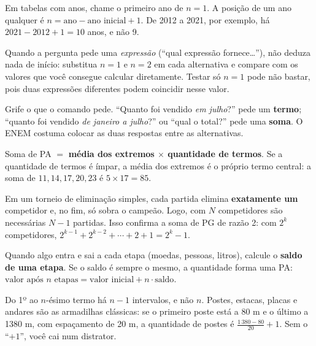 \begin{dica}
Em tabelas com anos, chame o primeiro ano de $n = 1$. A posição de um ano
qualquer é $n = \text{ano} - \text{ano inicial} + 1$. De 2012 a 2021, por
exemplo, há $2021 - 2012 + 1 = 10$ anos, e não 9.
\end{dica}

\begin{dica}[Teste as alternativas com $n = 1$ e $n = 2$]
Quando a pergunta pede uma \emph{expressão} (“qual expressão fornece\dots”),
não deduza nada de início: substitua $n = 1$ e $n = 2$ em cada alternativa e
compare com os valores que você consegue calcular diretamente. Testar só
$n = 1$ pode não bastar, pois duas expressões diferentes podem coincidir nesse
valor.
\end{dica}

\begin{dica}
Grife o que o comando pede. “Quanto foi vendido \emph{em julho}?” pede um
\textbf{termo}; “quanto foi vendido \emph{de janeiro a julho}?” ou “qual o
total?” pede uma \textbf{soma}. O ENEM costuma colocar as duas respostas entre
as alternativas.
\end{dica}

\begin{macete}
Soma de PA $=$ \textbf{média dos extremos $\times$ quantidade de termos}. Se a
quantidade de termos é ímpar, a média dos extremos é o próprio termo central:
a soma de $11, 14, 17, 20, 23$ é $5 \times 17 = 85$.
\end{macete}

\begin{macete}
Em um torneio de eliminação simples, cada partida elimina \textbf{exatamente
um} competidor e, no fim, só sobra o campeão. Logo, com $N$ competidores são
necessárias $N - 1$ partidas. Isso confirma a soma de PG de razão 2: com
$2^k$ competidores, $2^{k-1} + 2^{k-2} + \cdots + 2 + 1 = 2^k - 1$.
\end{macete}

\begin{macete}
Quando algo entra e sai a cada etapa (moedas, pessoas, litros), calcule o
\textbf{saldo de uma etapa}. Se o saldo é sempre o mesmo, a quantidade forma
uma PA: $\text{valor após } n \text{ etapas} = \text{valor inicial} + n \cdot
\text{saldo}$.
\end{macete}

\begin{atencao}[O $n - 1$ esquecido]
Do 1º ao $n$-ésimo termo há $n - 1$ intervalos, e não $n$. Postes, estacas,
placas e andares são as armadilhas clássicas: se o primeiro poste está a 80 m
e o último a \num{1380} m, com espaçamento de 20 m, a quantidade de postes é
$\frac{1\,380 - 80}{20} + 1$. Sem o “$+1$”, você cai num distrator.
\end{atencao}

